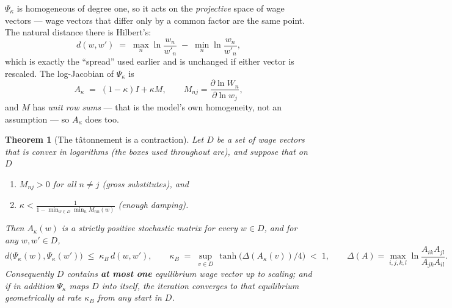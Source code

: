 \documentclass[11pt]{article}
\theoremstyle{plain}
\newtheorem{theorem}{Theorem}
\theoremstyle{remark}
\theoremstyle{definition}
\begin{document}
$\Psi_\kappa$ is homogeneous of degree one, so it acts on the \emph{projective} space of
wage vectors --- wage vectors that differ only by a common factor are the same point.
The natural distance there is Hilbert's:
\[
  d(w,w')\;=\;\max_n\ln\frac{w_n}{w'_n}\;-\;\min_n\ln\frac{w_n}{w'_n},
\]
which is exactly the ``spread'' used earlier and is unchanged if either vector is
rescaled. The log-Jacobian of $\Psi_\kappa$ is
\[
  A_\kappa \;=\; (1-\kappa)I+\kappa M,\qquad M_{nj}=\frac{\partial\ln W_n}{\partial\ln w_j},
\]
and $M$ has \emph{unit row sums} --- that is the model's own homogeneity, not an
assumption --- so $A_\kappa$ does too.

\begin{theorem}[The tâtonnement is a contraction]\label{thm:contract}
Let $D$ be a set of wage vectors that is \emph{convex in logarithms} (the boxes used
throughout are), and suppose that on $D$
\begin{enumerate}
\item[(i)] $M_{nj}>0$ for all $n\neq j$ \quad(gross substitutes), and
\item[(ii)] $\displaystyle \kappa<\frac{1}{1-\min_{w\in D}\min_n M_{nn}(w)}$ \quad(enough damping).
\end{enumerate}
Then $A_\kappa(w)$ is a strictly positive stochastic matrix for every $w\in D$, and
for any $w,w'\in D$,
\[
  d\bigl(\Psi_\kappa(w),\Psi_\kappa(w')\bigr)\;\le\;\kappa_B\,d(w,w'),
  \qquad
  \kappa_B\;=\;\sup_{v\in D}\,\tanh\!\bigl(\Delta(A_\kappa(v))/4\bigr)\;<\;1,
  \qquad
  \Delta(A)=\max_{i,j,k,l}\ln\frac{A_{ik}A_{jl}}{A_{jk}A_{il}} .
\]
Consequently $D$ contains \textbf{at most one} equilibrium wage vector up to scaling;
and if in addition $\Psi_\kappa$ maps $D$ into itself, the iteration converges to that
equilibrium geometrically at rate $\kappa_B$ from any start in $D$.
\end{theorem}
\end{document}
